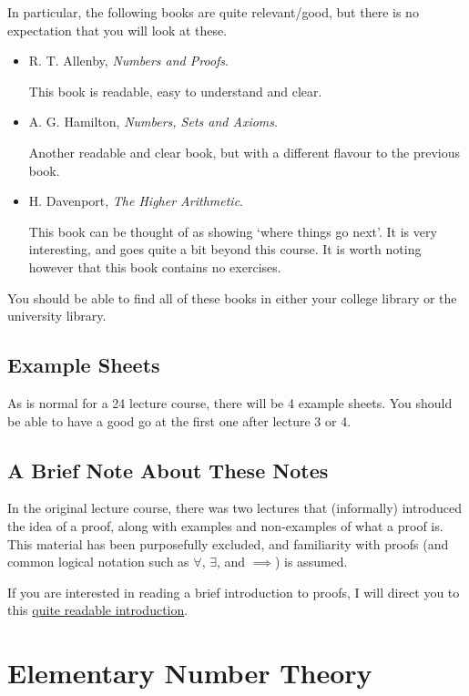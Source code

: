 \documentclass[a4]{scrartcl}
\begin{document}
In particular, the following books are quite relevant/good, but there is no expectation that you will look at these.

\begin{itemize}
	\item R. T. Allenby, \emph{Numbers and Proofs}.
	
	This book is readable, easy to understand and clear.

	\item A. G. Hamilton, \emph{Numbers, Sets and Axioms}.
	
	Another readable and clear book, but with a different flavour to the previous book.

	\item H. Davenport, \emph{The Higher Arithmetic}.

	This book can be thought of as showing `where things go next'. It is very interesting, and goes quite a bit beyond this course. It is worth noting however that this book contains no exercises.
\end{itemize}

You should be able to find all of these books in either your college library or the university library.

\subsection{Example Sheets}

As is normal for a 24 lecture course, there will be 4 example sheets. You should be able to have a good go at the first one after lecture 3 or 4.

\subsection{A Brief Note About These Notes}

In the original lecture course, there was two lectures that (informally) introduced the idea of a proof, along with examples and non-examples of what a proof is. This material has been purposefully excluded, and familiarity with proofs (and common logical notation such as $\forall$, $\exists$, and $\implies$) is assumed. 

If you are interested in reading a brief introduction to proofs, I will direct you to this \href{https://math.berkeley.edu/~hutching/teach/proofs.pdf}{quite readable introduction}.


\clearpage

\section{Elementary Number Theory}
\end{document}
